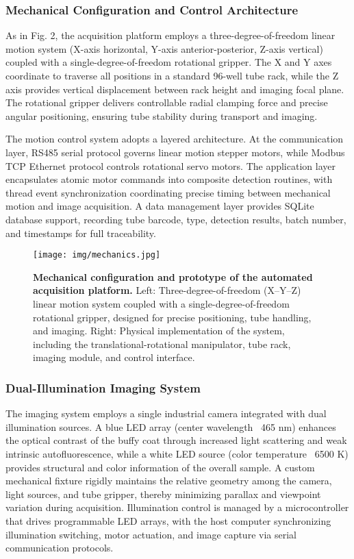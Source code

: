 \documentclass[journal,twoside,web]{ieeecolor}
\begin{document}
\subsubsection{Mechanical Configuration and Control Architecture} As in Fig. 2, the acquisition platform employs a three-degree-of-freedom linear motion system (X-axis horizontal, Y-axis anterior-posterior, Z-axis vertical) coupled with a single-degree-of-freedom rotational gripper. The X and Y axes coordinate to traverse all positions in a standard 96-well tube rack, while the Z axis provides vertical displacement between rack height and imaging focal plane. The rotational gripper delivers controllable radial clamping force and precise angular positioning, ensuring tube stability during transport and imaging.

The motion control system adopts a layered architecture. At the communication layer, RS485 serial protocol governs linear motion stepper motors, while Modbus TCP Ethernet protocol controls rotational servo motors. The application layer encapsulates atomic motor commands into composite detection routines, with thread event synchronization coordinating precise timing between mechanical motion and image acquisition. A data management layer provides SQLite database support, recording tube barcode, type, detection results, batch number, and timestamps for full traceability.

\begin{figure}[!t]
\centerline{\texttt{[image: img/mechanics.jpg]}}
\caption{\textbf{Mechanical configuration and prototype of the automated acquisition platform.} 
Left: Three-degree-of-freedom (X–Y–Z) linear motion system coupled with a single-degree-of-freedom rotational gripper, designed for precise positioning, tube handling, and imaging. 
Right: Physical implementation of the system, including the translational-rotational manipulator, tube rack, imaging module, and control interface.}
\label{fig mechanics}
\end{figure}

\subsubsection{Dual-Illumination Imaging System} The imaging system employs a single industrial camera integrated with dual illumination sources. A blue LED array (center wavelength ~465 nm) enhances the optical contrast of the buffy coat through increased light scattering and weak intrinsic autofluorescence, while a white LED source (color temperature ~6500 K) provides structural and color information of the overall sample. A custom mechanical fixture rigidly maintains the relative geometry among the camera, light sources, and tube gripper, thereby minimizing parallax and viewpoint variation during acquisition. Illumination control is managed by a microcontroller that drives programmable LED arrays, with the host computer synchronizing illumination switching, motor actuation, and image capture via serial communication protocols.
\end{document}
